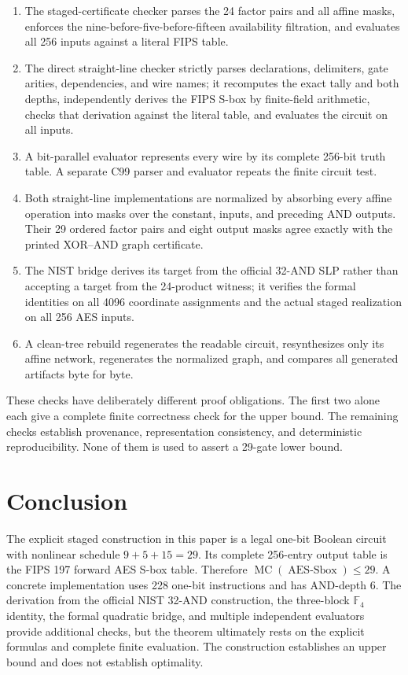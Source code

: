 \documentclass[11pt]{article}
\theoremstyle{definition}
\newcommand{\F}{\mathbb F}
\newcommand{\AES}{\operatorname{AES\mbox{-}Sbox}}
\newcommand{\MC}{\operatorname{MC}}
\begin{document}
\begin{enumerate}[leftmargin=2.4em]
\item The staged-certificate checker parses the 24 factor pairs and all affine masks, enforces the
nine-before-five-before-fifteen availability filtration, and evaluates all 256 inputs against a
literal FIPS table.
\item The direct straight-line checker strictly parses declarations, delimiters, gate arities,
dependencies, and wire names; it recomputes the exact tally and both depths, independently derives the
FIPS S-box by finite-field arithmetic, checks that derivation against the literal table, and evaluates
the circuit on all inputs.
\item A bit-parallel evaluator represents every wire by its complete 256-bit truth table.  A separate
C99 parser and evaluator repeats the finite circuit test.
\item Both straight-line implementations are normalized by absorbing every affine operation into
masks over the constant, inputs, and preceding AND outputs.  Their 29 ordered factor pairs and eight
output masks agree exactly with the printed XOR--AND graph certificate.
\item The NIST bridge derives its target from the official 32-AND SLP rather than accepting a target
from the 24-product witness; it verifies the formal identities on all 4096 coordinate assignments and
the actual staged realization on all 256 AES inputs.
\item A clean-tree rebuild regenerates the readable circuit, resynthesizes only its affine network,
regenerates the normalized graph, and compares all generated artifacts byte for byte.
\end{enumerate}

These checks have deliberately different proof obligations.  The first two alone each give a
complete finite correctness check for the upper bound.  The remaining checks establish provenance,
representation consistency, and deterministic reproducibility.  None of them is used to assert a
29-gate lower bound.

\section{Conclusion}
\label{sec:conclusion}

The explicit staged construction in this paper is a legal one-bit Boolean circuit with nonlinear
schedule \(9+5+15=29\).  Its complete 256-entry output table is the FIPS 197 forward AES S-box table.
Therefore \(\MC(\AES)\leq29\).  A concrete implementation uses 228 one-bit instructions and has
AND-depth 6.  The derivation from the official NIST 32-AND construction, the three-block
\(\F_4\) identity, the formal quadratic bridge, and multiple independent evaluators provide
additional checks, but the theorem ultimately rests on the explicit formulas and complete finite
evaluation.  The construction establishes an upper bound and does not establish optimality.
\end{document}
